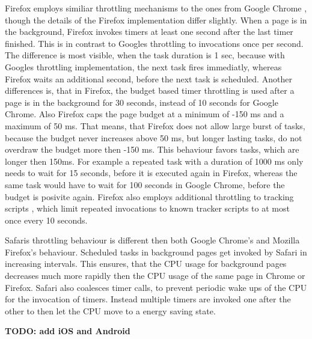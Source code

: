 \documentclass[article,type=bsc,colorback,accentcolor=tud9c]{tudthesis}
\begin{document}
  Firefox employs similiar throttling mechanisms to the ones from Google Chrome \cite{mdn-page-visibility}, though the details of the Firefox implementation differ slightly. When a page is in the background, Firefox invokes timers at least one second after the last timer finished. This is in contrast to Googles throttling to invocations once per second. The difference is most visible, when the task duration is 1 sec, because with Googles throttling implementation, the next task fires immediatly, whereas Firefox waits an additional second, before the next task is scheduled. Another differences is, that in Firefox, the budget based timer throttling is used after a page is in the background for 30 seconds, instead of 10 seconds for Google Chrome. Also Firefox caps the page budget at a minimum of -150 ms and a maximum of 50 ms. That means, that Firefox does not allow large burst of tasks, because the budget never increases above 50 ms, but longer lasting tasks, do not overdraw the budget more then -150 ms. This behaviour favors tasks, which are longer then 150ms. For example a repeated task with a duration of 1000 ms only needs to wait for 15 seconds, before it is executed again in Firefox, whereas the same task would have to wait for 100 seconds in Google Chrome, before the budget is posivite again. Firefox also employs additional throttling to tracking scripts \cite{mdn-tracker-throttling}, which limit repeated invocations to known tracker scripts to at most once every 10 seconds.

  Safaris throttling behaviour is different then both Google Chrome's and Mozilla Firefox's behaviour. Scheduled tasks in background pages get invoked by Safari in increasing intervals. This ensures, that the CPU usage for background pages decreases much more rapidly then the CPU usage of the same page in Chrome or Firefox. Safari also coalesces timer calls, to prevent periodic wake ups of the CPU for the invocation of timers. Instead multiple timers are invoked one after the other to then let the CPU move to a energy saving state.

  \textbf{TODO: add iOS and Android}
  
\end{document}
